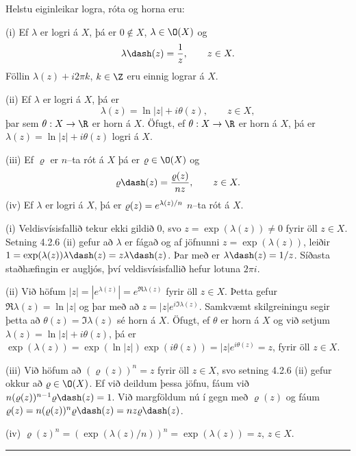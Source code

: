 Helstu eiginleikar logra, róta og horna eru:

\begin{se} (i) Ef $\lambda$ er logri á $X$, þá er $0\not\in X$, $\lambda\in \O(X)$ og
 $$\lambda\dash(z)=\frac 1z, \qquad z\in X.
 $$
Föllin $\lambda(z)+i2\pi k$, $k\in \Z$ eru einnig lograr á $X$.

\smallskip\noindent 
(ii) Ef $\lambda$ er logri á $X$, þá er  $$\lambda(z)=\ln
|z|+i\theta(z), \qquad z\in X,
 $$
þar sem  $\theta:X\to \R$ er horn á $X$.  Öfugt, ef 
$\theta:X\to \R$ er horn á $X$, þá er $\lambda(z)=\ln|z|+i\theta(z)$
logri á $X$.

\smallskip\noindent
(iii)  Ef $\varrho$ er $n$--ta rót á $X$ þá er $\varrho\in \O(X)$ og
 $$\varrho\dash(z)=\frac {\varrho(z)}{nz}, \qquad z\in X.
 $$
(iv) Ef $\lambda$ er logri á $X$, þá er
$\varrho(z)=e\sp{\lambda(z)/n}$ $n$--ta rót á $X$.
\end{se}


\begin{so} (i) Veldisvísisfallið tekur ekki gildið $0$, svo
$z=\exp(\lambda(z))\neq 0$ fyrir öll $z\in X$.  Setning 4.2.6 (ii)
gefur að $\lambda$ er fágað og af jöfnunni $z=\exp(\lambda(z))$,
leiðir $1=\exp(\lambda(z))\lambda\dash(z)=z\lambda\dash(z)$.  Þar með
er $\lambda\dash(z)=1/z$.  Síðasta staðhæfingin er augljós, því
veldisvísisfallið hefur lotuna $2\pi i$.  

\smallskip
(ii) Við höfum $|z|=|e^{\lambda(z)}|=e^{\Re \lambda(z)}$ 
fyrir öll $z\in X$.  Þetta
gefur $\Re \lambda(z)=\ln |z|$ og þar með að $z=|z|e^{i\Im \lambda(z)}$. 
Samkvæmt skilgreiningu segir þetta að $\theta(z)=\Im\lambda(z)$
sé horn á $X$. Öfugt, ef $\theta$ er horn á $X$ og við setjum
$\lambda(z)=\ln |z|+i\theta(z)$, þá er
$\exp(\lambda(z))=\exp(\ln|z|)\exp(i\theta(z))=|z|e^{i\theta(z)}=z$,
fyrir öll $z\in X$.

\smallskip
(iii)  Við höfum að $(\varrho(z))^n=z$ fyrir öll $z\in X$, svo
setning 4.2.6 (ii) gefur okkur að $\varrho\in \O(X)$.  Ef við deildum
þessa jöfnu, fáum við $n(\varrho(z))^{n-1}\varrho\dash(z)=1$.  Við
margföldum nú í gegn með $\varrho(z)$ og fáum 
$\varrho(z)=n(\varrho(z))^n\varrho\dash(z)=nz\varrho\dash(z)$.

\smallskip
(iv)   $\varrho(z)^n=(\exp(\lambda(z)/n))^n=\exp(\lambda(z))=z$, $z\in X$.
\end{so}



\bigskip\hrule\bigskip

